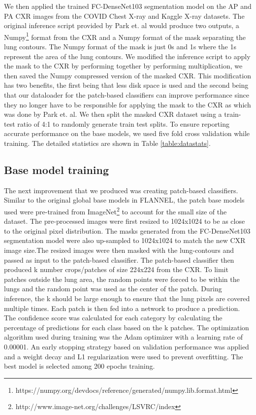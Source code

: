 \documentclass{sigkddExp}
\begin{document}
We then applied the trained FC-DenseNet103 segmentation model on the AP and PA
CXR images from the COVID Chest X-ray and Kaggle X-ray datasets. The original
inference script provided by Park et. al would produce two outputs, a Numpy\footnote{
https://numpy.org/devdocs/reference/generated/numpy.lib.format.html} format
from the CXR and a Numpy format of the mask separating the lung
contours. The Numpy format of the mask is just 0s and 1s where the 1s
represent the area of the lung contours.  We modified the inference script to
apply the mask to the CXR by performing together by performing multiplication,
we then saved the Numpy compressed version of the masked CXR. This modification
has two benefits, the first being that less disk space is used and the second
being that our dataloader for the patch-based classifiers can improve
performance since they no longer have to be responsible for applying the mask to
the CXR as which was done by Park et. al. We then split the masked CXR dataset
using a train-test ratio of 4:1 to randomly generate train test splits. To
ensure reporting accurate performance on the base models, we used five fold
cross validation while training. The detailed statistics are shown in Table
\ref{table:datastats}.

\subsection{Base model training}
The next improvement that we produced was creating patch-based classifiers.
Similar to the original global base models in FLANNEL, the patch base models
used were pre-trained from
ImageNet\footnote{http://www.image-net.org/challenges/LSVRC/index} to account
for the small size of the dataset. The pre-processed images were first resized
to 1024x1024 to be as close to the original pixel distribution. The masks
generated from the FC-DenseNet103 segmentation model were also up-sampled to
1024x1024 to match the new CXR image size.The resized images were then masked
with the lung-contours and passed as input to the patch-based classifier. The
patch-based classifier then produced k number crops/patches of size 224x224 from
the CXR. To limit patches outside the lung area, the random points were forced
to be within the lungs and the random point was used as the center of the patch.
During inference, the k should be large enough to ensure that the lung pixels
are covered multiple times. Each patch is then fed into a network to produce a
prediction. The confidence score was calculated for each category by calculating
the percentage of predictions for each class based on the k patches. The
optimization algorithm used during training was the Adam optimizer with a
learning rate of 0.00001. An early stopping strategy based on validation
performance was applied and a weight decay and L1 regularization were used to
prevent overfitting. The best model is selected among 200 epochs training.
\end{document}
